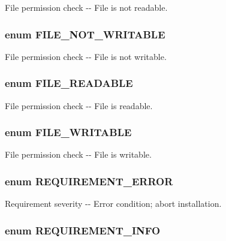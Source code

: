 \label{install_8inc_ab09b4a70a73804ec35333d43a878a572}
File permission check -\/-\/ File is not readable. \hypertarget{install_8inc_a01939e1b55bf40d1ac3556eded13a353}{
\subsubsection[{FILE\_\-NOT\_\-WRITABLE}]{\setlength{\rightskip}{0pt plus 5cm}enum {\bf FILE\_\-NOT\_\-WRITABLE}}}
\label{install_8inc_a01939e1b55bf40d1ac3556eded13a353}
File permission check -\/-\/ File is not writable. \hypertarget{install_8inc_a5a3ab6bb8b0df419dff1d9c741e5ca56}{
\subsubsection[{FILE\_\-READABLE}]{\setlength{\rightskip}{0pt plus 5cm}enum {\bf FILE\_\-READABLE}}}
\label{install_8inc_a5a3ab6bb8b0df419dff1d9c741e5ca56}
File permission check -\/-\/ File is readable. \hypertarget{install_8inc_a18edb581d332bd2fe379104a39e3b1a2}{
\subsubsection[{FILE\_\-WRITABLE}]{\setlength{\rightskip}{0pt plus 5cm}enum {\bf FILE\_\-WRITABLE}}}
\label{install_8inc_a18edb581d332bd2fe379104a39e3b1a2}
File permission check -\/-\/ File is writable. \hypertarget{install_8inc_aeddf02286107904721cb582bd430581d}{
\subsubsection[{REQUIREMENT\_\-ERROR}]{\setlength{\rightskip}{0pt plus 5cm}enum {\bf REQUIREMENT\_\-ERROR}}}
\label{install_8inc_aeddf02286107904721cb582bd430581d}
Requirement severity -\/-\/ Error condition; abort installation. \hypertarget{install_8inc_ab679de0810b6a879525b822fa33e3d75}{
\subsubsection[{REQUIREMENT\_\-INFO}]{\setlength{\rightskip}{0pt plus 5cm}enum {\bf REQUIREMENT\_\-INFO}}}
